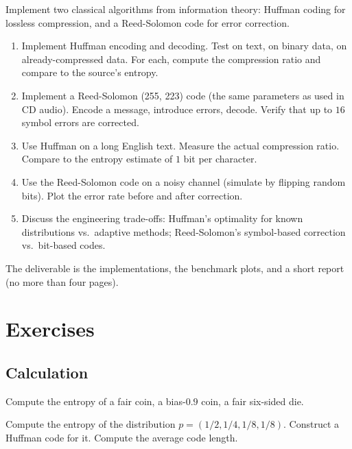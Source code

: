 \begin{project}
Implement two classical algorithms from information theory: Huffman coding for lossless compression, and a Reed-Solomon code for error correction.

\begin{enumerate}[leftmargin=*]
  \item Implement Huffman encoding and decoding. Test on text, on binary data, on already-compressed data. For each, compute the compression ratio and compare to the source's entropy.
  \item Implement a Reed-Solomon (255, 223) code (the same parameters as used in CD audio). Encode a message, introduce errors, decode. Verify that up to $16$ symbol errors are corrected.
  \item Use Huffman on a long English text. Measure the actual compression ratio. Compare to the entropy estimate of $1$ bit per character.
  \item Use the Reed-Solomon code on a noisy channel (simulate by flipping random bits). Plot the error rate before and after correction.
  \item Discuss the engineering trade-offs: Huffman's optimality for known distributions vs.\ adaptive methods; Reed-Solomon's symbol-based correction vs.\ bit-based codes.
\end{enumerate}

The deliverable is the implementations, the benchmark plots, and a short report (no more than four pages).
\end{project}

\section{Exercises}

\subsection*{Calculation}

\begin{exercise}
Compute the entropy of a fair coin, a bias-$0.9$ coin, a fair six-sided die.
\end{exercise}

\begin{exercise}
Compute the entropy of the distribution $p = (1/2, 1/4, 1/8, 1/8)$. Construct a Huffman code for it. Compute the average code length.
\end{exercise}

